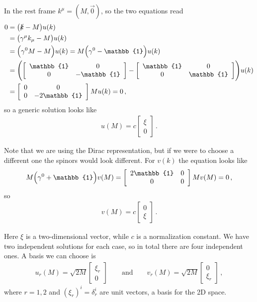 \documentclass[main.tex]{subfiles}
\begin{document}
In the rest frame \(k^{\mu } = (M, \vec{0})\), so the two equations read 
%
\begin{align}
0&= \qty(\slashed{k} - M) u(k)  \\
&= \qty(\gamma^{\mu }k_{\mu } - M) u(k)  \\
&= \qty(\gamma^{0} M - M ) u(k) = M \qty(\gamma^{0} - \mathbb{1}) u(k)  \\
&=\qty( \left[\begin{array}{cc}
\mathbb{1} & 0 \\ 
0 & -\mathbb{1}
\end{array}\right] 
-
\left[\begin{array}{cc}
\mathbb{1} & 0 \\ 
0 & \mathbb{1}
\end{array}\right]
) u(k)  \\
&= \left[\begin{array}{cc}
0 & 0 \\ 
0 & -2 \mathbb{1}
\end{array}\right] M u(k) =0
\,,
\end{align}
%
so a generic solution looks like 
%
\begin{align}
u(M) = c \left[\begin{array}{c}
\xi  \\ 
0
\end{array}\right]
\,.
\end{align}

Note that we are using the Dirac representation, but if we were to choose a different one the spinors would look different. 
For \(v(k)\) the equation looks like 
%
\begin{align}
M \qty(\gamma^{0} + \mathbb{1}) v(M) =
\left[\begin{array}{cc}
2 \mathbb{1} & 0 \\ 
0 & 0
\end{array}\right] M v(M) = 0
\,,
\end{align}
%
so 
%
\begin{align}
v(M) = c \left[\begin{array}{c}
0 \\ 
\xi 
\end{array}\right]
\,.
\end{align}

Here \(\xi \) is a two-dimensional vector, while \(c\) is a normalization constant. 
We have two independent solutions for each case, so in total there are four independent ones. 
A basis we can choose is 
%
\begin{align}
u_{r} (M) = \sqrt{2M} \left[\begin{array}{c}
\xi_{r} \\ 
0
\end{array}\right]
\qquad \text{and} \qquad
v_{r} (M) = \sqrt{2M} \left[\begin{array}{c}
0 \\
\xi_{r} 
\end{array}\right]
\,,
\end{align}
%
where \(r=1,2\) and \((\xi_{r})^{i} = \delta^{i}_{r}\) are unit vectors, a basis for the 2D space. 
\end{document}
